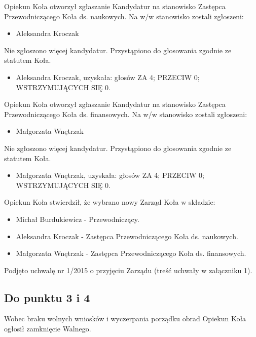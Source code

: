 \documentclass{article}
\begin{document}
Opiekun Koła otworzył zgłaszanie Kandydatur na stanowisko Zastępca Przewodniczącego Koła ds. naukowych. Na w/w stanowisko zostali zgłoszeni:
  \begin{itemize}
    \item Aleksandra Kroczak
  \end{itemize}

Nie zgłoszono więcej kandydatur. Przystąpiono do głosowania zgodnie ze statutem Koła.
  \begin{itemize}
    \item Aleksandra Kroczak, uzyskała: głosów ZA 4; PRZECIW 0; WSTRZYMUJĄCYCH SIĘ 0.
  \end{itemize}
  
Opiekun Koła otworzył zgłaszanie Kandydatur na stanowisko Zastępca Przewodniczącego Koła ds. finansowych. Na w/w stanowisko zostali zgłoszeni:
  \begin{itemize}
    \item Małgorzata Wnętrzak
  \end{itemize}

Nie zgłoszono więcej kandydatur. Przystąpiono do głosowania zgodnie ze statutem Koła.
  \begin{itemize}
    \item Małgorzata Wnętrzak, uzyskała: głosów ZA 4; PRZECIW 0; WSTRZYMUJĄCYCH SIĘ 0.
  \end{itemize}  
  
Opiekun Koła stwierdził, że wybrano nowy Zarząd Koła w składzie:
  \begin{itemize}
    \item Michał Burdukiewicz - Przewodniczący.
    \item Aleksandra Kroczak - Zastępca Przewodniczącego Koła ds. naukowych.
    \item Małgorzata Wnętrzak - Zastępca Przewodniczącego Koła ds. finansowych.
  \end{itemize}
  
Podjęto uchwałę nr 1/2015 o przyjęciu Zarządu (treść uchwały w załączniku 1).
  
\subsection{Do punktu 3 i 4}
Wobec braku wolnych wniosków i wyczerpania porządku obrad Opiekun Koła ogłosił zamknięcie Walnego.


\vfill
\end{document}
